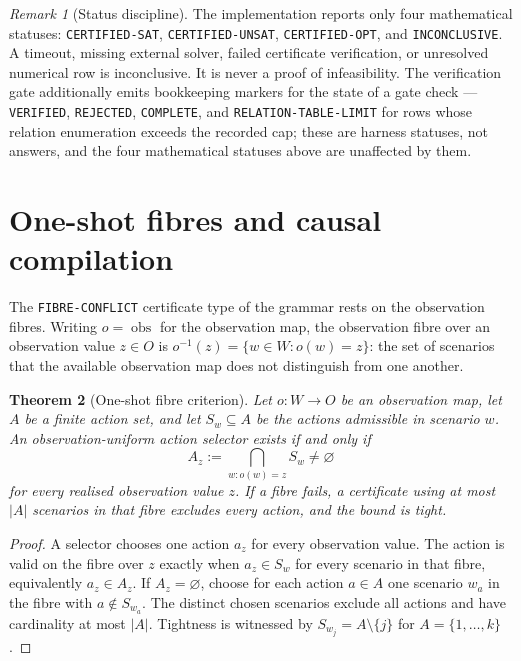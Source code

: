 \documentclass[11pt]{article}
\theoremstyle{plain}
\newtheorem{theorem}{Theorem}[section]
\theoremstyle{definition}
\theoremstyle{remark}
\newtheorem{remark}[theorem]{Remark}
\begin{document}
\begin{remark}[Status discipline]
\label{rem:status-discipline}
The implementation reports only four mathematical statuses:
\texttt{CERTIFIED-SAT}, \texttt{CERTIFIED-UNSAT}, \texttt{CERTIFIED-OPT}, and
\texttt{INCONCLUSIVE}.  A timeout, missing external solver, failed certificate
verification, or unresolved numerical row is inconclusive.  It is never a proof
of infeasibility.  The verification gate additionally emits bookkeeping
markers for the state of a gate check --- \texttt{VERIFIED},
\texttt{REJECTED}, \texttt{COMPLETE}, and \texttt{RELATION-TABLE-LIMIT} for
rows whose relation enumeration exceeds the recorded cap; these are harness
statuses, not answers, and the four mathematical statuses above are unaffected
by them.
\end{remark}

\section{One-shot fibres and causal compilation}
\label{sec:fibres-compilation}

The \texttt{FIBRE-CONFLICT} certificate type of the grammar rests on the
observation fibres.  Writing \(o=\operatorname{obs}\) for the observation map,
the observation fibre over an observation value \(z\in O\) is
\(o^{-1}(z)=\{w\in W:o(w)=z\}\): the set of scenarios that the available
observation map does not distinguish from one another.

\begin{theorem}[One-shot fibre criterion]
\label{thm:fibre-criterion}
Let \(o:W\to O\) be an observation map, let \(A\) be a finite action set, and
let \(S_w\subseteq A\) be the actions admissible in scenario \(w\).  An
observation-uniform action selector exists if and only if
\[
  A_z:=\bigcap_{w:o(w)=z}S_w\ne\varnothing
\]
for every realised observation value \(z\).  If a fibre fails, a certificate
using at most \(|A|\) scenarios in that fibre excludes every action, and the
bound is tight.
\end{theorem}

\begin{proof}
A selector chooses one action \(a_z\) for every observation value.  The action is
valid on the fibre over \(z\) exactly when \(a_z\in S_w\) for every scenario in
that fibre, equivalently \(a_z\in A_z\).  If \(A_z=\varnothing\), choose for each
action \(a\in A\) one scenario \(w_a\) in the fibre with \(a\notin S_{w_a}\).
The distinct chosen scenarios exclude all actions and have cardinality at most
\(|A|\).  Tightness is witnessed by \(S_{w_j}=A\setminus\{j\}\) for
\(A=\{1,\ldots,k\}\).
\end{proof}
\end{document}
